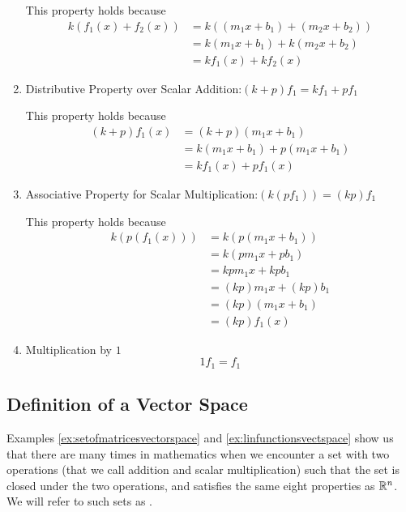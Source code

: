 \documentclass{ximera}
\begin{document}
\begin{example}
\begin{explanation}
\begin{enumerate}
  This property holds because
 \begin{align*}
  k(f_1(x) + f_2(x)) &= k((m_1 x + b_1) + (m_2 x + b_2))\\  &= k(m_1 x + b_1) + k(m_2 x + b_2)\\  &= k f_1(x) + k f_2(x)
  \end{align*}
  
  \item
  Distributive Property over Scalar Addition:\quad $(k+p)f_1=kf_1+pf_1$  
  
  This property holds because
  \begin{align*}(k+p)f_1(x)&= (k+p)(m_1 x + b_1)\\ &=k(m_1 x + b_1) + p(m_1 x + b_1)\\ &= k f_1(x) + p f_1(x)\end{align*}
 
  \item 
  Associative Property for Scalar Multiplication:\quad $(k(pf_1))=(kp)f_1$ 
  
  This property holds because
  \begin{align*}k(p(f_1(x)))&=k(p(m_1 x + b_1))\\
  &=k(p m_1 x +p b_1)\\ 
  &=kp m_1 x +kp b_1\\ 
  &= (kp) m_1 x + (kp) b_1\\ 
  &= (kp)(m_1 x + b_1)\\
  &=(kp)f_1(x)\end{align*}
  
  \item 
  Multiplication by $1$ 
  $$1 f_1=f_1$$
  \end{enumerate}
  \end{explanation}
\end{example}

\subsection*{Definition of a Vector Space}

Examples \ref{ex:setofmatricesvectorspace} and \ref{ex:linfunctionsvectspace} show us that there are many times in mathematics when we encounter a set with two operations (that we call addition and scalar multiplication) such that the set is closed under the two operations, and satisfies the same eight properties as $\mathbb{R}^n$.  We will refer to such sets as .
\end{document}
